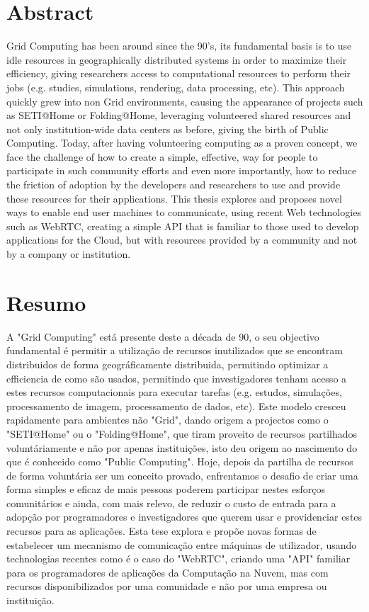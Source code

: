 \chapter*{Abstract}
\thispagestyle{empty}

Grid Computing has been around since the 90's, its fundamental basis is to use idle resources in geographically distributed systems in order to maximize their efficiency, giving researchers access to computational resources to perform their jobs (e.g. studies, simulations, rendering, data processing, etc). This approach quickly grew into non Grid environments, causing the appearance of projects such as SETI@Home or Folding@Home, leveraging volunteered shared resources and not only institution-wide data centers as before, giving the birth of Public Computing. Today, after having volunteering computing as a proven concept, we face the challenge of how to create a simple, effective, way for people to participate in such community efforts and even more importantly, how to reduce the friction of adoption by the developers and researchers to use and provide these resources for their applications. This thesis explores and proposes novel ways to enable end user machines to communicate, using recent Web technologies such as WebRTC, creating a simple API that is familiar to those used to develop applications for the Cloud, but with resources provided by a community and not by a company or institution.


\newpage
\chapter*{Resumo}
\thispagestyle{empty}

A "Grid Computing" está presente deste a década de 90, o seu objectivo fundamental é permitir a utilização de recursos inutilizados que se encontram distribuidos de forma geográficamente distribuida, permitindo optimizar a efficiencia de como são usados, permitindo que investigadores tenham acesso a estes recursos computacionais para executar tarefas (e.g. estudos, simulações, processamento de imagem, processamento de dados, etc). Este modelo cresceu rapidamente para ambientes não "Grid", dando origem a projectos como o "SETI@Home" ou o "Folding@Home", que tiram proveito de recursos partilhados voluntáriamente e não por apenas instituições, isto deu origem ao nascimento do que é conhecido como "Public Computing". Hoje, depois da partilha de recursos de forma voluntária ser um conceito provado, enfrentamos o desafio de criar uma forma simples e eficaz de mais pessoas poderem participar nestes esforços comunitários e ainda, com mais relevo, de reduzir o custo de entrada para a adopção por programadores e investigadores que querem usar e providenciar estes recursos para as aplicações. Esta tese explora e propõe novas formas de estabelecer um mecanismo de comunicação entre máquinas de utilizador, usando technologias recentes como é o caso do "WebRTC", criando uma "API" familiar para os programadores de aplicações da Computação na Nuvem, mas com recursos disponibilizados por uma comunidade e não por uma empresa ou instituição.

